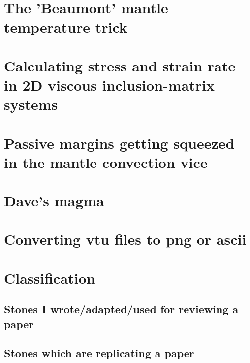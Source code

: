 \documentclass[a4paper,11pt]{report}
\begin{document}
\chapter{The 'Beaumont' mantle temperature trick \label{f141}} %

\chapter{Calculating stress and strain rate in 2D viscous inclusion-matrix systems \label{f142}} %

\chapter{Passive margins getting squeezed in the mantle convection vice \label{f143}} %

\chapter{Dave's magma \label{f144}} %

\chapter{Converting vtu files to png or ascii \label{f145}} %


\appendix
\chapter{Classification}

\section{
Stones I wrote/adapted/used for reviewing a paper}

\section{
Stones which are replicating a paper}
\end{document}
